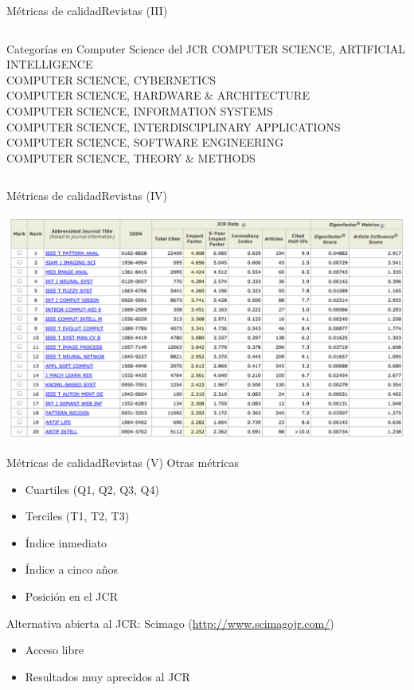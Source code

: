 \documentclass{beamer}
\begin{document}
\begin{frame}{Métricas de calidad}{Revistas (III)}
	\begin{center}
	\begin{columns}
	\column{\textwidth}
	\begin{block}{Categorías en Computer Science del JCR}
		COMPUTER SCIENCE, ARTIFICIAL INTELLIGENCE\\
		COMPUTER SCIENCE, CYBERNETICS\\
		COMPUTER SCIENCE, HARDWARE \& ARCHITECTURE\\
		COMPUTER SCIENCE, INFORMATION SYSTEMS\\
		COMPUTER SCIENCE, INTERDISCIPLINARY APPLICATIONS\\
		COMPUTER SCIENCE, SOFTWARE ENGINEERING\\
		COMPUTER SCIENCE, THEORY \& METHODS
	\end{block}
	\end{columns}
	\end{center}
\end{frame}

\begin{frame}{Métricas de calidad}{Revistas (IV)}
	 \begin{center}
	    \includegraphics[width=1\linewidth]{figs/jcr.png}
 	 \end{center}
\end{frame}

\begin{frame}{Métricas de calidad}{Revistas (V)}
	Otras métricas
  	\begin{itemize}
		\item Cuartiles (Q1, Q2, Q3, Q4)
		\item Terciles (T1, T2, T3)
		\item Índice inmediato
		\item Índice a cinco años
		\item Posición en el JCR
	\end{itemize}
	Alternativa abierta al JCR: Scimago (\url{http://www.scimagojr.com/})
  	\begin{itemize}
		\item Acceso libre
		\item Resultados muy aprecidos al JCR
	\end{itemize}
\end{frame}
\end{document}
